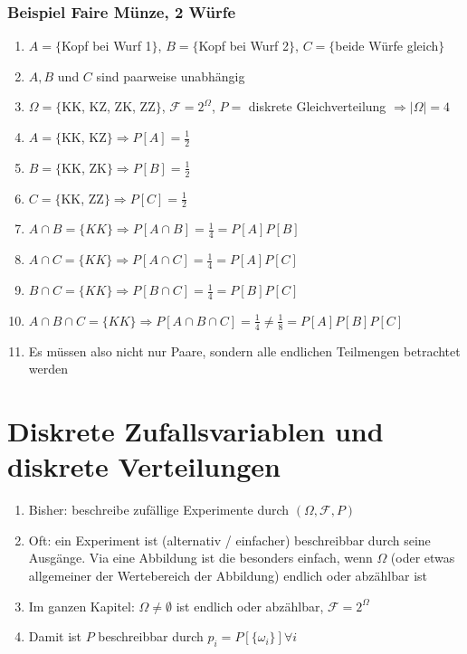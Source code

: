 \documentclass[10pt]{article}
\newcommand{\enumstart}{\begin{enumerate}}
\newcommand{\enumend}{\end{enumerate}}
\newcommand{\F}{\mathcal{F}}
\begin{document}
\subsubsection{Beispiel Faire Münze, 2 Würfe}
\enumstart
	\item $A = \{$Kopf bei Wurf 1$\}$, $B = \{$Kopf bei Wurf 2$\}$, $C = \{$beide Würfe gleich$\}$
	\item $A,B$ und $C$ sind paarweise unabhängig
	\item $\Omega = \{$KK, KZ, ZK, ZZ$\}$, $\F = 2^\Omega$, $P =$ diskrete Gleichverteilung $\Rightarrow |\Omega| = 4$
	\item $A = \{$KK, KZ$\} \Rightarrow P[A] = \frac{1}{2}$
	\item $B = \{$KK, ZK$\} \Rightarrow P[B] = \frac{1}{2}$
	\item $C = \{$KK, ZZ$\} \Rightarrow P[C] = \frac{1}{2}$
	\item $A \cap B = \{KK\} \Rightarrow P[A \cap B] = \frac{1}{4} = P[A]P[B]$
	\item $A \cap C = \{KK\} \Rightarrow P[A \cap C] = \frac{1}{4} = P[A]P[C]$
	\item $B \cap C = \{KK\} \Rightarrow P[B \cap C] = \frac{1}{4} = P[B]P[C]$
	\item $A \cap B \cap C = \{KK\} \Rightarrow P[A \cap B \cap C] = \frac{1}{4} \ne \frac{1}{8} = P[A]P[B]P[C]$
	\item Es müssen also nicht nur Paare, sondern alle endlichen Teilmengen betrachtet werden
\enumend

\section{Diskrete Zufallsvariablen und diskrete Verteilungen}
\enumstart
	\item Bisher: beschreibe zufällige Experimente durch $(\Omega, \F, P)$
	\item Oft: ein Experiment ist (alternativ / einfacher) beschreibbar durch seine Ausgänge. Via eine Abbildung ist die besonders einfach, wenn $\Omega$ (oder etwas allgemeiner der Wertebereich der Abbildung) endlich oder abzählbar ist
	\item Im ganzen Kapitel: $\Omega \ne \emptyset$ ist endlich oder abzählbar, $\F = 2^\Omega$
	\item Damit ist $P$ beschreibbar durch $p_i = P[\{\omega_i\}] \forall i$
\enumend
\end{document}
